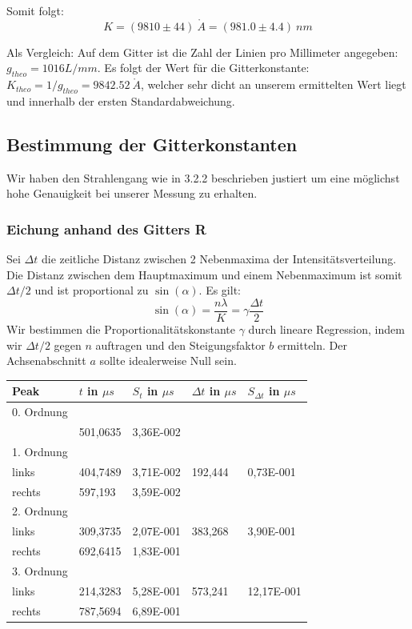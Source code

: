 Somit folgt: $$\boxed{K=(9810 \pm 44) \ \mathring A = (981.0 \pm 4.4) \ nm}$$

Als Vergleich: Auf dem Gitter ist die Zahl der Linien pro Millimeter angegeben: \\ $g_{theo}=1016 L/mm$. Es folgt der Wert f\"ur die Gitterkonstante: $K_{theo} = 1/g_{theo} = 9842.52 \ \mathring A$, welcher sehr dicht an unserem ermittelten Wert liegt und innerhalb der ersten Standardabweichung.

\subsection{Bestimmung der Gitterkonstanten}

Wir haben den Strahlengang wie in 3.2.2 beschrieben justiert um eine m\"oglichst hohe Genauigkeit bei unserer Messung zu erhalten.

\subsubsection{Eichung anhand des Gitters R}

Sei $\Delta t$ die zeitliche Distanz zwischen 2 Nebenmaxima der Intensit\"atsverteilung. Die Distanz zwischen dem Hauptmaximum und einem Nebenmaximum ist somit $\Delta t/2$ und ist proportional zu $\sin(\alpha)$. Es gilt: $$\sin(\alpha) = \frac{n\lambda}{K} = \gamma \frac{\Delta t}{2}$$
Wir bestimmen die Proportionalit\"atskonstante $\gamma$ durch lineare Regression, indem wir $\Delta t/2$ gegen $n$ auftragen und den Steigungsfaktor $b$ ermitteln. Der Achsenabschnitt $a$ sollte idealerweise Null sein.

\begin{center}
\begin{tabular}{lllll}
\toprule
Peak & $t$ in $\mu s$ & $S_t$ in $\mu s$ & $\Delta t$ in $\mu s$ & $S_{\Delta t}$ in $\mu s$ \\
\midrule
0. Ordnung \\
 & 501,0635 & 3,36E-002\\
\midrule
1. Ordnung\\
links & 404,7489 & 3,71E-002 & 192,444 & 0,73E-001\\
rechts & 597,193 & 3,59E-002\\
\midrule
2. Ordnung\\ 
links & 309,3735 & 2,07E-001 & 383,268 & 3,90E-001\\
rechts & 692,6415 & 1,83E-001\\
\midrule
3. Ordnung\\ 
links & 214,3283 & 5,28E-001 & 573,241 & 12,17E-001\\
rechts & 787,5694 & 6,89E-001\\
\bottomrule
\end{tabular}
\end{center}

